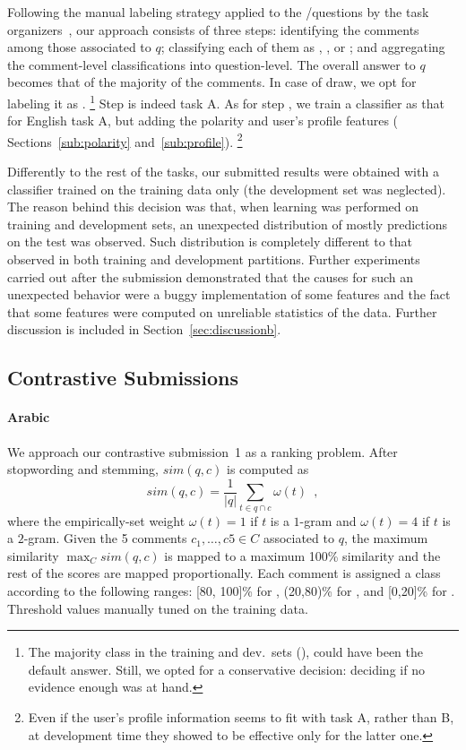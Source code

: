 Following the manual labeling strategy applied to the \yes/\no questions by the 
task organizers~\cite{Marquez-EtAl:2015:SemEval}, our approach 
consists of three steps:
\Ni identifying the \good comments among those associated to $q$;
\Nii classifying each of them as \yes, \no, or \unsure; and 
\Niii aggregating the comment-level classifications into question-level. The 
overall answer to $q$ becomes that of the majority of the comments. In case of 
draw, we opt for labeling it as \unsure.%
\footnote{The majority class in the training and dev.\ sets (\yes), could have 
been the default answer. Still, we opted for a conservative decision: deciding 
\unsure if no evidence enough was at hand.}
Step \Ni is indeed task A. As for step \Nii, we train a classifier as that for 
English task A, but adding the polarity and user's profile features (\cf 
Sections~\ref{sub:polarity} and~\ref{sub:profile}).%
\footnote{Even if the user's profile information seems to fit with task A, 
rather than B, at development time they showed to be effective only for the 
latter one.}

Differently to the rest of the tasks, our submitted results were obtained with a 
classifier trained on the training data only (the development set was 
neglected). The reason behind this decision was that, when learning was 
performed on training and development sets, an unexpected distribution of mostly 
\yes predictions on the test was observed. Such distribution is completely 
different to that observed in both training and development partitions. Further 
experiments carried out after the submission demonstrated that the causes for 
such an unexpected behavior were a buggy implementation of some features and the 
fact that some features were computed on unreliable statistics of the data. 
Further discussion is included in Section~\ref{sec:discussionb}.


\subsection{Contrastive Submissions}
\label{sub:contrastive}

\paragraph{Arabic} 

We approach our contrastive submission~1 as a ranking problem. After 
stopwording and stemming, $sim(q,c)$ is computed as 
\begin{equation}
 sim(q,c) = \frac{1}{|q|} \sum_{t\in q\cap c} \omega(t) \enspace ,
 \label{eq:overlap}
\end{equation}
% 
where the empirically-set weight $\omega(t)=1$ if $t$ is a $1$-gram and 
$\omega(t)=4$ if $t$ is a $2$-gram. Given the 5 comments $c_1,\ldots,c5\in C$ 
associated to $q$, the maximum similarity $\max_C sim(q,c)$ is mapped to a 
maximum 100\% similarity and the rest of the scores are mapped proportionally. 
Each comment is assigned a class according to the following ranges: [80, 100]\% 
for \dir, (20,80)\% for \rel, and [0,20]\% for \irel. Threshold values manually 
tuned on the training data.


